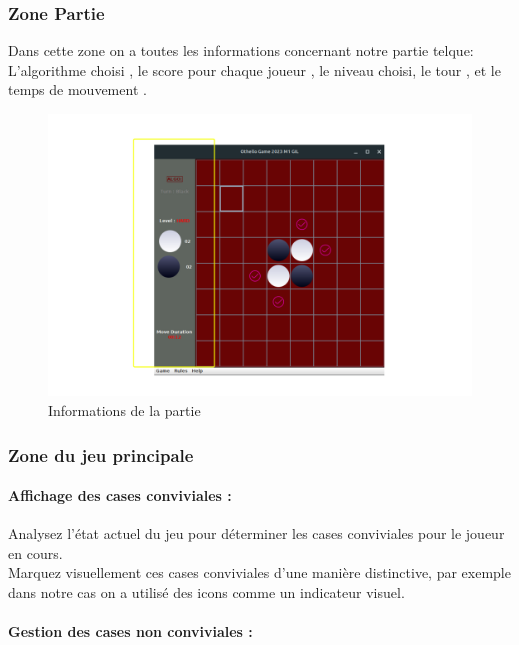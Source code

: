 \documentclass[12pt]{article}
\begin{document}
\subsubsection{Zone Partie}
Dans cette zone on a toutes les informations concernant notre partie telque:
L'algorithme choisi , le score pour chaque joueur , le niveau choisi, le tour , et le temps de mouvement .

	\begin{figure}[H]
	\centering
	\includegraphics[scale=0.3]{img/pion.png}
	\caption{Informations de la partie}
	\label{pion}
\end{figure}

\subsubsection{Zone du jeu principale}

\paragraph{Affichage des cases conviviales :}

Analysez l'état actuel du jeu pour déterminer les cases conviviales pour le joueur en cours.\\
Marquez visuellement ces cases conviviales d'une manière distinctive, par exemple dans notre cas on a utilisé des icons comme un indicateur visuel.
\paragraph{Gestion des cases non conviviales :}
\end{document}
